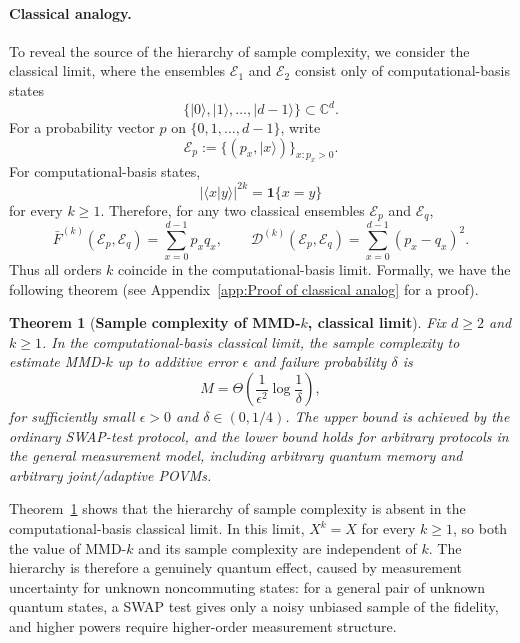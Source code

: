 \documentclass[aps,prx,reprint,superscriptaddress,amsmath,amssymb,longbibliography,floatfix]{revtex4-2}
\newcommand{\abs}[1]{\lvert #1\rvert}
\providecommand{\ket}[1]{|#1 \rangle}
\providecommand{\braket}[2]{\langle #1|#2 \rangle}
\newcommand{\dsC}{\mathbb{C}}
\newcommand{\scD}{\mathcal{D}}
\newcommand{\scE}{\mathcal{E}}
\theoremstyle{plain}
\newtheorem{theorem}{Theorem}[section]
\theoremstyle{definition}
\theoremstyle{remark}
\begin{document}
\paragraph{Classical analogy.}

To reveal the source of the hierarchy of sample complexity, we consider the classical limit, where the ensembles \(\scE_1\) and \(\scE_2\) consist only of computational-basis states
\[
    \{\ket{0},\ket{1},\ldots,\ket{d-1}\}\subset \dsC^d .
\]
For a probability vector \(p\) on \(\{0,1,\ldots,d-1\}\), write
\[
    \scE_p:=\{(p_x,\ket{x})\}_{x:p_x>0}.
\]
For computational-basis states,
\begin{equation}
    \abs{\braket{x}{y}}^{2k}
    =
    \mathbf 1\{x=y\}
\end{equation}
for every \(k\ge1\). Therefore, for any two classical ensembles \(\scE_p\) and \(\scE_q\),
\begin{equation}
    \bar F^{(k)}(\scE_p,\scE_q)
    =
    \sum_{x=0}^{d-1}p_xq_x,
    \qquad
    \scD^{(k)}(\scE_p,\scE_q)
    =
    \sum_{x=0}^{d-1}(p_x-q_x)^2 .
    \label{eq: classical MMD-k collapse}
\end{equation}
Thus all orders \(k\) coincide in the computational-basis limit. Formally, we have the following theorem (see Appendix~\ref{app:Proof of classical analog} for a proof).

\begin{theorem}[\textbf{Sample complexity of MMD-\(k\), classical limit}]
    \label{thm: sample complexity MMD-k, classical}
    Fix \(d\ge2\) and \(k\ge1\). In the computational-basis classical limit, the sample complexity to estimate MMD-\(k\) up to additive error \(\epsilon\) and failure probability \(\delta\) is
    \begin{equation}
        M
        =
        \Theta\!\left(
            \frac{1}{\epsilon^2}\log\frac1\delta
        \right),
    \end{equation}
    for sufficiently small \(\epsilon>0\) and \(\delta\in(0,1/4)\). The upper bound is achieved by the ordinary SWAP-test protocol, and the lower bound holds for arbitrary protocols in the general measurement model, including arbitrary quantum memory and arbitrary joint/adaptive POVMs.
\end{theorem}



Theorem~\ref{thm: sample complexity MMD-k, classical} shows that the hierarchy of sample complexity is absent in the computational-basis classical limit. In this limit, \(X^k=X\) for every \(k\ge1\), so both the value of MMD-\(k\) and its sample complexity are independent of \(k\). The hierarchy is therefore a genuinely quantum effect, caused by measurement uncertainty for unknown noncommuting states: for a general pair of unknown quantum states, a SWAP test gives only a noisy unbiased sample of the fidelity, and higher powers require higher-order measurement structure.
\end{document}
